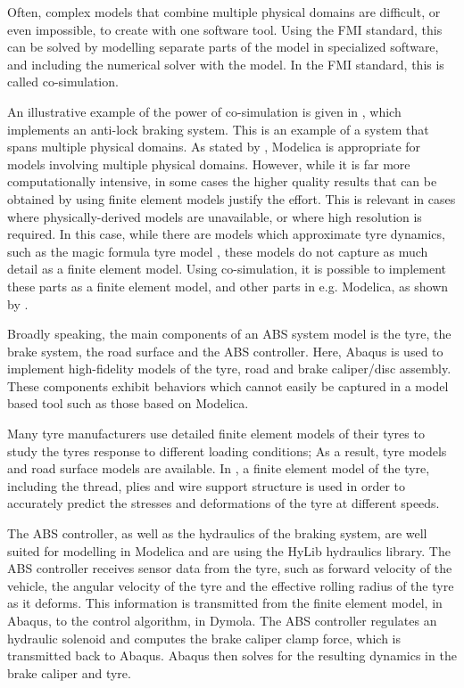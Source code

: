 \documentclass[\rootfolder/main.tex]{subfiles}
\begin{document}
Often, complex models that combine multiple physical domains are difficult, or even impossible, to create with one software tool.
Using the FMI standard, this can be solved by modelling separate parts of the model in specialized software, and including the numerical solver with the model.
In the FMI standard, this is called co-simulation.

An illustrative example of the power of co-simulation is given in \cite{Schofield}, which implements an anti-lock braking system.
This is an example of a system that spans multiple physical domains.
As stated by \cite{Schofield}, Modelica is appropriate for models involving multiple physical domains.
However, while it is far more computationally intensive, in some cases the higher quality results that can be obtained by using finite element models justify the effort.
This is relevant in cases where physically-derived models are unavailable, or where high resolution is required.
In this case, while there are models which approximate tyre dynamics, such as the magic formula tyre model \cite{Pacejka2012}, these models do not capture as much detail as a finite element model.
Using co-simulation, it is possible to implement these parts as a finite element model, and other parts in e.g. Modelica, as shown by \cite{Schofield}.

Broadly speaking, the main components of an ABS system model is the tyre, the brake system, the road surface and the ABS controller.
Here, Abaqus is used to implement high-fidelity models of the tyre, road and brake caliper/disc assembly.
These components exhibit behaviors which cannot easily be captured in a model based tool such as those based on Modelica.

Many tyre manufacturers use detailed finite element models of their tyres to study the tyres response to different loading conditions;
As a result, tyre models and road surface models are available.
In \cite{Schofield}, a finite element model of the tyre, including the thread, plies and wire support structure is used in order to accurately predict the stresses and deformations of the tyre at different speeds.

The ABS controller, as well as the hydraulics of the braking system, are well suited for modelling in Modelica and are using the HyLib hydraulics library.
The ABS controller receives sensor data from the tyre, such as forward velocity of the vehicle, the angular velocity of the tyre and the effective rolling radius of the tyre as it deforms.
This information is transmitted from the finite element model, in Abaqus, to the control algorithm, in Dymola.
The ABS controller regulates an hydraulic solenoid and computes the brake caliper clamp force, which is transmitted back to Abaqus.
Abaqus then solves for the resulting dynamics in the brake caliper and tyre.
\end{document}
